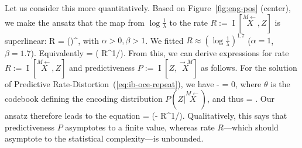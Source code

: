 \documentclass[entropy,article,submit,moreauthors,pdftex,10pt,a4paper]{Definitions/mdpi}
\newif \ifcomment
\newcommand\rljf[1]{\ifcomment{{\color{blue}(#1)}}\else{}\fi}
\newcommand{\finitefuture}{\stackrel{\rightarrow \scriptscriptstyle{M}}{X}}
\newcommand{\finitepast}{\stackrel{\scriptscriptstyle{M}\leftarrow}{X}}%
\let\oldequation\equation
\let\oldendequation\endequation
\renewenvironment{equation}
  {\linenomathNonumbers\oldequation}
  {\oldendequation\endlinenomath}
\begin{document}
Let us consider this more quantitatively.
Based on Figure~\ref{fig:eng-pos} (center), we make the ansatz that the map from $\log\frac{1}{\lambda}$ to the rate $R := \operatorname{I}[\finitepast, Z]$ is superlinear:
\begin{equation}\label{eq:r-alpha-beta}
	R = \alpha \left(\log{}\right)^\beta,
\end{equation}
	with $\alpha>0, \beta>1$.
We fitted $R \approx \left(\log\frac{1}{\lambda}\right)^{1.7}$ ($\alpha=1$, $\beta=1.7$).
Equivalently
\begin{equation}
 = \exp\left( R^{1/\beta}\right).
\end{equation}
From this, we can derive expressions for rate $R := \operatorname{I}[\finitepast, Z]$ and predictiveness $P := \operatorname{I}[Z, \finitefuture]$ as follows.
For the solution of Predictive Rate-Distortion~(\ref{eq:ib-oce-repeat}), we have
\begin{equation}
	 - \lambda {} = 0,
\end{equation}
where $\theta$ is the codebook defining the encoding distribution $P(Z|\finitepast)$, and thus
\begin{equation}
\lambda =	.
\end{equation}
Our ansatz therefore leads to the equation
\begin{equation}\label{eq:derivatives}
 = \exp\left(- R^{1/\beta}\right). %
\end{equation}
Qualitatively, this says that predictiveness $P$ asymptotes to a finite value, whereas rate $R$---which should asymptote to the statistical complexity---is unbounded. 
\end{document}
